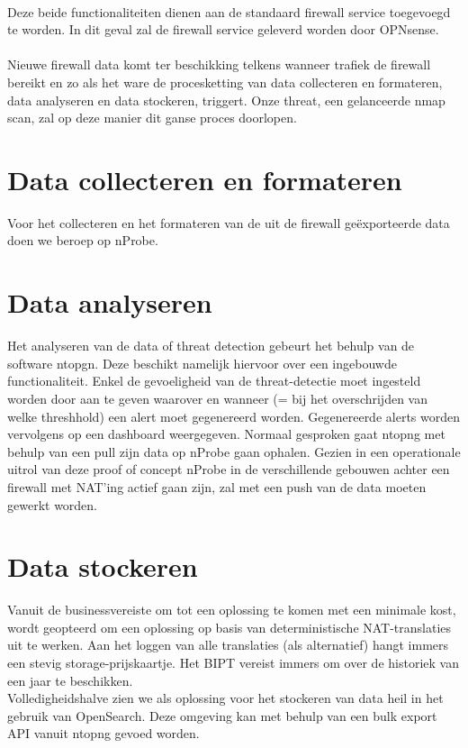 \paragraph{}
Deze beide functionaliteiten dienen aan de standaard firewall service toegevoegd te worden. In dit geval zal de firewall service geleverd worden door OPNsense.

\paragraph{}
Nieuwe firewall data komt ter beschikking telkens wanneer trafiek de firewall bereikt en zo als het ware de procesketting van data collecteren en formateren, data analyseren en data stockeren, triggert. Onze threat, een gelanceerde nmap scan, zal op deze manier dit ganse proces doorlopen.

\section{Data collecteren en formateren}
Voor het collecteren en het formateren van de uit de firewall geëxporteerde data doen we beroep op nProbe.

\section{Data analyseren}
Het analyseren van de data of threat detection gebeurt het behulp van de software ntopgn. Deze beschikt namelijk hiervoor over een ingebouwde functionaliteit. Enkel de gevoeligheid van de threat-detectie moet ingesteld worden door aan te geven waarover en wanneer (= bij het overschrijden van welke threshhold) een alert moet gegenereerd worden. Gegenereerde alerts worden vervolgens op een dashboard weergegeven. Normaal gesproken gaat ntopng met behulp van een pull zijn data op nProbe gaan ophalen. Gezien in een operationale uitrol van deze proof of concept nProbe in de verschillende gebouwen achter een firewall met NAT’ing actief gaan zijn, zal met een push van de data moeten gewerkt worden.

\section{Data stockeren}
Vanuit de businessvereiste om tot een oplossing te komen met een minimale kost, wordt geopteerd om een oplossing op basis van deterministische NAT-translaties uit te werken. Aan het loggen van alle translaties (als alternatief) hangt immers een stevig storage-prijskaartje. Het BIPT vereist immers om over de historiek van een jaar te beschikken.\\ Volledigheidshalve zien we als oplossing voor het stockeren van data heil in het gebruik van OpenSearch. Deze omgeving kan met behulp van een bulk export API vanuit ntopng gevoed worden.

